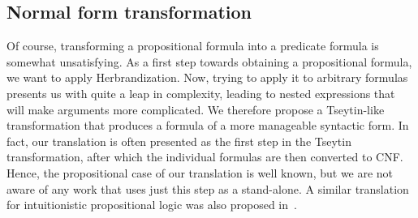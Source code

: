 \documentclass[a4paper,11pt]{report}
\theoremstyle{definition}
\theoremstyle{definition}
\theoremstyle{definition}
\theoremstyle{definition}
\theoremstyle{definition}
\theoremstyle{definition}
\theoremstyle{definition}
\begin{document}
	\subsection{Normal form transformation}\label{section:tseytin}
	
	Of course, transforming a propositional formula into a predicate formula is somewhat unsatisfying. As a first step towards obtaining a propositional formula, we want to apply Herbrandization. Now, trying to apply it to arbitrary formulas presents us with quite a leap in complexity, leading to nested expressions that will make arguments more complicated. We therefore propose a Tseytin-like transformation that produces a formula of a more manageable syntactic form. In fact, our translation is often presented as the first step in the Tseytin transformation, after which the individual formulas are then converted to CNF.
	Hence, the propositional case of our translation is well known, but we are not aware of any work that uses just this step as a stand-alone. A similar translation for intuitionistic propositional logic was also proposed in~\cite{statman1979intuitionistic}.
	
\end{document}

